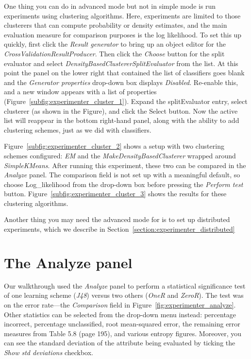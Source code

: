 One thing you can do in advanced mode but not in simple mode is run
experiments using clustering algorithms. Here, experiments are limited
to those clusterers that can compute probability or density estimates,
and the main evaluation measure for comparison purposes is the log
likelihood. To set this up quickly, first click the \textit{Result
  generator} to bring up an object editor for the
\textit{CrossValidationResultProducer}. Then click the \textit{Choose}
button for the split evaluator and select
\textit{DensityBasedClustererSplitEvaluator} from the list. At this
point the panel on the lower right that contained the list of
classifiers goes blank and the \textit{Generator properties} drop-down
box displays \textit{Disabled}. Re-enable this, and a new window
appears with a list of properties
(Figure~\ref{subfig:experimenter_cluster_1}). Expand the
splitEvaluator entry, select clusterer (as shown in the Figure), and
click the Select button. Now the active list will reappear in the
bottom right-hand panel, along with the ability to add clustering
schemes, just as we did with classifiers.

Figure~\ref{subfig:experimenter_cluster_2} shows a setup with two
clustering schemes configured: \textit{EM} and the
\textit{MakeDensityBasedClusterer} wrapped around
\textit{SimpleKMeans}. After running this experiment, these two can be
compared in the \textit{Analyze} panel. The comparison field is not
set up with a meaningful default, so choose Log\_likelihood from the
drop-down box before pressing the \textit{Perform test}
button. Figure~\ref{subfig:experimenter_cluster_3} shows the results
for these clustering algorithms.

Another thing you may need the advanced mode for is to set up
distributed experiments, which we describe in
Section~\ref{section:experimenter_distributed}

\section{The Analyze panel}

Our walkthrough used the \textit{Analyze} panel to perform a
statistical significance test of one learning scheme (\textit{J48})
versus two others (\textit{OneR} and \textit{ZeroR}). The test was on
the error rate---the \textit{Comparison} field in
Figure~\ref{fig:experimenter_analyze}. Other statistics can be
selected from the drop-down menu instead: percentage incorrect,
percentage unclassified, root mean-squared error, the remaining error
measures from Table 5.8 (page 195), and various entropy
figures. Moreover, you can see the standard deviation of the attribute
being evaluated by ticking the \textit{Show std deviations} checkbox.

